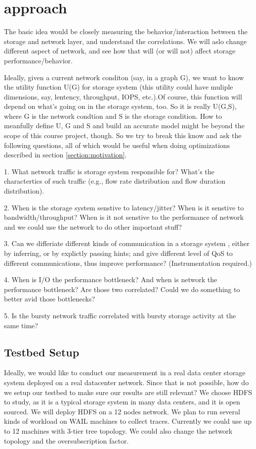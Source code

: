 \section{approach}
\label{sec:approach}
The basic idea would be closely measuring the behavior/interaction between the storage and network layer, and understand the correlations. We will aslo change different aspect of network, and see how that will (or will not) affect storage performance/behavior.

Ideally, given a current network conditon (say, in a graph G), we want to know the utility function U(G) for storage system (this utility could have muliple dimensions, say, lentency, throughput, IOPS, etc.).Of course, this function will depend on what's going on in the storage system, too. So it is really U(G,S), where G is the network condtion and S is the storage  condition. How to meanfully define U, G and S and build an accurate model might be beyond the scope of this course project, though. So we try to break this know and ask the following questions, all of which would be useful when doing optimizations described in section \ref{section:motivation}.

1. What network traffic is storage system responsible for? What's the charactertics of such traffic (e.g., flow rate distribution and flow duration distribution).

2. When is the storage system senstive to latency/jitter? When is it senstive to bandwidth/throughput? When is it not senstive to the performance of network and we could use the network to do other important stuff? 

3. Can we differiate different kinds of communication in a storage system %
, either by inferring, or by explictly passing hints; and give different level of QoS to different communications, thus improve performance? (Instrumentation required.)

4. When is I/O the performance bottleneck? And when is network the performance bottleneck? Are those two correlated? Could we do something to better avid those bottlenecks?

5. Is the bursty network traffic correlated with bursty storage activity at the same time? 






\subsection {\bf Testbed Setup}
Ideally, we would like to conduct our measurement in a real data center storage system deployed on a real datacenter network. Since that is not possible, how do we setup our testbed to make sure our results are still relevant? 
We choose HDFS to study, as it is a typical storage system in many data centers, and it is open sourced. We will deploy HDFS on a 12 nodes network. We plan to run several kinds of workload on WAIL machines to collect traces. Currently we could use up to 12 machines with 3-tier tree topology. We could also change the network topology and the oversubscription factor. 

